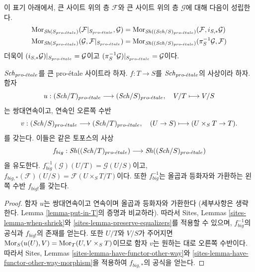 \noindent
이 표기 아래에서, 큰 사이트 위의 층 $\mathcal{F}$와 큰 사이트 위의 층
$\mathcal{G}$에 대해 다음이 성립한다.
\begin{align*}
\mathop{\mathrm{Mor}}\nolimits_{\mathop{\mathit{Sh}}\nolimits(S_{pro\text{-}\acute{e}tale})}(\mathcal{F}|_{S_{pro\text{-}\acute{e}tale}}, \mathcal{G})
& =
\mathop{\mathrm{Mor}}\nolimits_{\mathop{\mathit{Sh}}\nolimits((\mathit{Sch}/S)_{pro\text{-}\acute{e}tale})}(\mathcal{F},
i_{S, *}\mathcal{G}) \\
\mathop{\mathrm{Mor}}\nolimits_{\mathop{\mathit{Sh}}\nolimits(S_{pro\text{-}\acute{e}tale})}(\mathcal{G}, \mathcal{F}|_{S_{pro\text{-}\acute{e}tale}})
& =
\mathop{\mathrm{Mor}}\nolimits_{\mathop{\mathit{Sh}}\nolimits((\mathit{Sch}/S)_{pro\text{-}\acute{e}tale})}(\pi_S^{-1}\mathcal{G}, \mathcal{F})
\end{align*}
더욱이 $(i_{S, *}\mathcal{G})|_{S_{pro\text{-}\acute{e}tale}} = \mathcal{G}$이고
$(\pi_S^{-1}\mathcal{G})|_{S_{pro\text{-}\acute{e}tale}} = \mathcal{G}$이다.

\begin{lemma}
\label{lemma-morphism-big}
$\mathit{Sch}_{pro\text{-}\acute{e}tale}$를 큰 pro-\'etale 사이트라 하자.
$f : T \to S$를 $\mathit{Sch}_{pro\text{-}\acute{e}tale}$의 사상이라 하자. 함자
$$
u : (\mathit{Sch}/T)_{pro\text{-}\acute{e}tale} \longrightarrow (\mathit{Sch}/S)_{pro\text{-}\acute{e}tale}, \quad
V/T \longmapsto V/S
$$
는 쌍대연속이고, 연속인 오른쪽 수반
$$
v : (\mathit{Sch}/S)_{pro\text{-}\acute{e}tale} \longrightarrow (\mathit{Sch}/T)_{pro\text{-}\acute{e}tale}, \quad
(U \to S) \longmapsto (U \times_S T \to T).
$$
를 갖는다. 이들은 같은 토포스의 사상
$$
f_{big} :
\mathop{\mathit{Sh}}\nolimits((\mathit{Sch}/T)_{pro\text{-}\acute{e}tale})
\longrightarrow
\mathop{\mathit{Sh}}\nolimits((\mathit{Sch}/S)_{pro\text{-}\acute{e}tale})
$$
을 유도한다. $f_{big}^{-1}(\mathcal{G})(U/T) = \mathcal{G}(U/S)$이고,
$f_{big, *}(\mathcal{F})(U/S) = \mathcal{F}(U \times_S T/T)$이다.
또한 $f_{big}^{-1}$는 올곱과 등화자와 가환하는 왼쪽 수반
$f_{big!}$를 갖는다.
\end{lemma}

\begin{proof}
함자 $u$는 쌍대연속이고 연속이며 올곱과 등화자와 가환한다
(세부사항은 생략한다. Lemma \ref{lemma-put-in-T}의 증명과 비교하라).
따라서 Sites, Lemmas \ref{sites-lemma-when-shriek}와
\ref{sites-lemma-preserve-equalizers}를 적용할 수 있으며,
$f_{big}^{-1}$의 공식과 $f_{big!}$의 존재를 얻는다.
또한 $U/T$와 $V/S$가 주어지면
$\mathop{\mathrm{Mor}}\nolimits_S(u(U), V) = \mathop{\mathrm{Mor}}\nolimits_T(U, V \times_S T)$이므로 함자 $v$는
원하는 대로 오른쪽 수반이다. 따라서 Sites, Lemmas
\ref{sites-lemma-have-functor-other-way}와
\ref{sites-lemma-have-functor-other-way-morphism}을 적용하여
$f_{big, *}$의 공식을 얻는다.
\end{proof}

